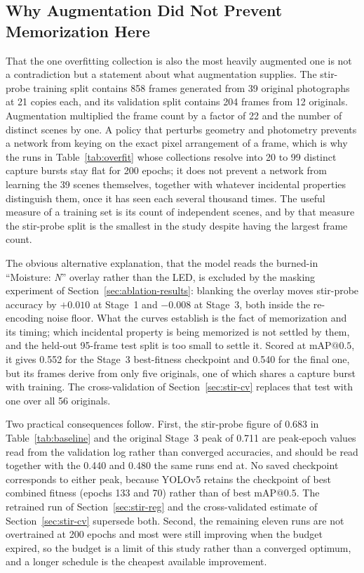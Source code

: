 ﻿\documentclass[journal]{IEEEtran}
\begin{document}
\subsection{Why Augmentation Did Not Prevent Memorization Here}
\label{sec:aug-limits}
That the one overfitting collection is also the most heavily augmented one is not a contradiction but a statement about what augmentation supplies. The stir-probe training split contains 858 frames generated from 39 original photographs at 21 copies each, and its validation split contains 204 frames from 12 originals. Augmentation multiplied the frame count by a factor of 22 and the number of distinct scenes by one. A policy that perturbs geometry and photometry prevents a network from keying on the exact pixel arrangement of a frame, which is why the runs in Table~\ref{tab:overfit} whose collections resolve into 20 to 99 distinct capture bursts stay flat for 200 epochs; it does not prevent a network from learning the 39 scenes themselves, together with whatever incidental properties distinguish them, once it has seen each several thousand times. The useful measure of a training set is its count of independent scenes, and by that measure the stir-probe split is the smallest in the study despite having the largest frame count.

The obvious alternative explanation, that the model reads the burned-in ``Moisture: \emph{N}'' overlay rather than the LED, is excluded by the masking experiment of Section~\ref{sec:ablation-results}: blanking the overlay moves stir-probe accuracy by $+0.010$ at Stage~1 and $-0.008$ at Stage~3, both inside the re-encoding noise floor. What the curves establish is the fact of memorization and its timing; which incidental property is being memorized is not settled by them, and the held-out 95-frame test split is too small to settle it. Scored at $\text{mAP@0.5}$, it gives 0.552 for the Stage~3 best-fitness checkpoint and 0.540 for the final one, but its frames derive from only five originals, one of which shares a capture burst with training. The cross-validation of Section~\ref{sec:stir-cv} replaces that test with one over all 56 originals.

Two practical consequences follow. First, the stir-probe figure of 0.683 in Table~\ref{tab:baseline} and the original Stage~3 peak of 0.711 are peak-epoch values read from the validation log rather than converged accuracies, and should be read together with the 0.440 and 0.480 the same runs end at. No saved checkpoint corresponds to either peak, because YOLOv5 retains the checkpoint of best combined fitness (epochs 133 and 70) rather than of best $\text{mAP@0.5}$. The retrained run of Section~\ref{sec:stir-reg} and the cross-validated estimate of Section~\ref{sec:stir-cv} supersede both. Second, the remaining eleven runs are not overtrained at 200 epochs and most were still improving when the budget expired, so the budget is a limit of this study rather than a converged optimum, and a longer schedule is the cheapest available improvement.
\end{document}
